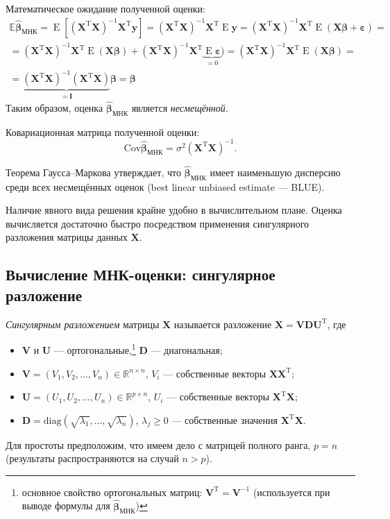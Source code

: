 \documentclass[12pt,a4paper,final]{article}
\DeclareMathOperator{\E}{E}
\newcommand{\betah}{\hat{\bm \beta}}
\newcommand{\betaa}{\bm{\beta}}
\newcommand{\epss}{\bm{\varepsilon}}
\newcommand{\XT}{{\bm{X}}^{\mathrm{T}}}
\newcommand{\X}{\bm{X}}
\newcommand{\y}{\bm{y}}
\newcommand{\1}{\mathds{1}}
\begin{document}
Математическое ожидание полученной оценки:
\begin{multline}
	\mathbb{E} \betah_{\text{МНК}} = \E [(\XT \X)^{-1}\XT \y] = (\XT \X)^{-1}\XT \E \y = (\XT \X)^{-1}\XT \E (\X \betaa + \epss) = \\ = (\XT \X)^{-1}\XT \E (\X \betaa) + (\XT \X)^{-1}\XT \underbrace{\E \epss}_{= 0}) = (\XT \X)^{-1}\XT \E (\X \betaa) = \\ = \underbrace{(\XT \X)^{-1}(\XT\X)}_{= \mathbf I}\betaa = \betaa
\end{multline}
Таким образом, оценка $\betah_{\text{МНК}}$ является \textit{несмещённой}. 

Ковариационная матрица полученной оценки:
\begin{equation}
	\mathrm{Cov}{\betah_{\text{МНК}}} = \sigma^2 (\XT\X)^{-1}.
	\label{eq:var}
\end{equation}

Теорема Гаусса–Маркова утверждает, что $\betah_{\text{МНК}}$ имеет
наименьшую дисперсию среди всех несмещённых оценок (best
linear unbiased estimate — BLUE).

Наличие явного вида решения крайне удобно в вычислительном плане. 
Оценка вычисляется достаточно быстро посредством применения сингулярного разложения матрицы данных $\X$.


\subsection{Вычисление МНК-оценки: сингулярное разложение}

\textit{Сингулярным разложением} матрицы $\X$ называется разложение $\X = \bm V \bm D \bm U^\mathrm T$, где
\begin{itemize}
\item $\bm V$ и $\bm U$ --- ортогональные,\footnote{основное свойство ортогональных матриц: $\bm V^\mathrm T =\bm V^{-1}$ (используется при выводе формулы для $\betah_{\text{МНК}}$)} $\bm D$ --- диагональная;
\item $\bm V = (V_1, V_2, \ldots, V_n) \in \mathbb R^{n\times n}$, $V_i$ --- собственные векторы $\X \XT$;
\item $\bm U = (U_1, U_2, \ldots, U_n) \in \mathbb R^{p\times n}$, $U_i$ --- собственные векторы $\XT \X$;
\item $\bm D = \mathrm{diag}(\sqrt{\lambda_1}, \ldots,\sqrt{\lambda_n})$, $\lambda_j \geqslant 0$ --- собственные значения $\XT \X$.
\end{itemize}
Для простоты предположим, что имеем дело с матрицей полного ранга, $p = n$ (результаты распространяются на случай $n>p$).
\end{document}
